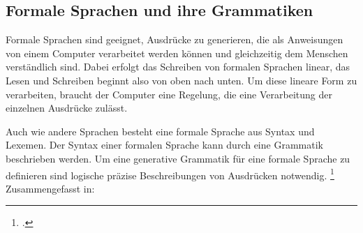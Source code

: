  




\pagebreak
   
   
\subsection{Formale Sprachen und ihre Grammatiken}
Formale Sprachen sind geeignet, Ausdrücke zu generieren, die als Anweisungen von einem Computer verarbeitet werden können und gleichzeitig dem Menschen verständlich sind. Dabei erfolgt das Schreiben von formalen Sprachen linear, das Lesen und Schreiben beginnt also von oben nach unten. Um diese lineare Form zu verarbeiten, braucht der Computer eine Regelung, die eine Verarbeitung der einzelnen Ausdrücke zulässt.

Auch wie andere Sprachen besteht eine formale Sprache aus Syntax und Lexemen. Der Syntax einer formalen Sprache kann durch eine Grammatik beschrieben werden.
Um eine generative Grammatik für eine formale Sprache zu definieren sind logische präzise Beschreibungen von Ausdrücken notwendig. \footcite[Vgl. ][S. 149ff. ]{automata} Zusammengefasst in:

